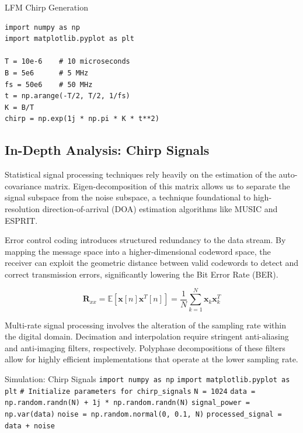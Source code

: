 \begin{pythonbox}{LFM Chirp Generation}
\begin{verbatim}
import numpy as np
import matplotlib.pyplot as plt

T = 10e-6    # 10 microseconds
B = 5e6      # 5 MHz
fs = 50e6    # 50 MHz
t = np.arange(-T/2, T/2, 1/fs)
K = B/T
chirp = np.exp(1j * np.pi * K * t**2)
\end{verbatim}
\end{pythonbox}

\subsection{In-Depth Analysis: Chirp Signals}
Statistical signal processing techniques rely heavily on the estimation of the auto-covariance matrix. Eigen-decomposition of this matrix allows us to separate the signal subspace from the noise subspace, a technique foundational to high-resolution direction-of-arrival (DOA) estimation algorithms like MUSIC and ESPRIT.

Error control coding introduces structured redundancy to the data stream. By mapping the message space into a higher-dimensional codeword space, the receiver can exploit the geometric distance between valid codewords to detect and correct transmission errors, significantly lowering the Bit Error Rate (BER).

\begin{equation}
    \mathbf{R}_{xx} = \mathbb{E}[\mathbf{x}[n]\mathbf{x}^T[n]] = \frac{1}{N} \sum_{k=1}^{N} \mathbf{x}_k \mathbf{x}_k^T
\end{equation}

Multi-rate signal processing involves the alteration of the sampling rate within the digital domain. Decimation and interpolation require stringent anti-aliasing and anti-imaging filters, respectively. Polyphase decompositions of these filters allow for highly efficient implementations that operate at the lower sampling rate.

\begin{pythonbox}{Simulation: Chirp Signals}
\texttt{import numpy as np}
\texttt{import matplotlib.pyplot as plt}
\texttt{}
\texttt{\# Initialize parameters for chirp\_signals}
\texttt{N = 1024}
\texttt{data = np.random.randn(N) + 1j * np.random.randn(N)}
\texttt{signal\_power = np.var(data)}
\texttt{noise = np.random.normal(0, 0.1, N)}
\texttt{processed\_signal = data + noise}
\end{pythonbox}

